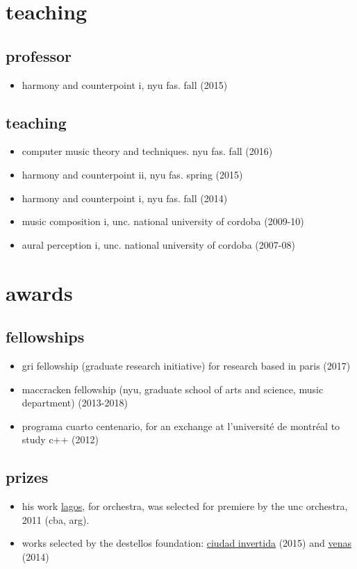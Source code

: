 \documentclass{book}
\begin{document}
\section{teaching}
\subsection{professor}
\begin{itemize}
\item harmony and counterpoint i, nyu fas. fall (2015)
\end{itemize}
\subsection{teaching}
\begin{itemize}
\item computer music theory and techniques. nyu fas. fall (2016)
\item harmony and counterpoint ii, nyu fas. spring (2015)
\item harmony and counterpoint i, nyu fas. fall (2014)
\item music composition i, unc. national university of cordoba (2009-10)
\item aural perception i, unc. national university of cordoba (2007-08)
\end{itemize}
 
\section{awards}
\subsection{fellowships}
\begin{itemize}
\item gri fellowship (graduate research initiative) for research based in paris (2017)
\item maccracken fellowship (nyu, graduate school of arts and science, music department) (2013-2018)
\item programa cuarto centenario, for an exchange at l'université de montréal to study c++ (2012)
\end{itemize}
\subsection{prizes}
\begin{itemize}
\item his work \href{http://fedecamarahalac.com/lagos.php }{lagos}, for orchestra, was selected for premiere by the unc orchestra, 2011 (cba, arg).
\item works selected by the destellos foundation: \href{http://fedecamarahalac.com/ciudad.php" }{ciudad invertida} (2015) and \href{http://fedecamarahalac.com/venas.php" }{venas} (2014)
\end{itemize}
\end{document}
